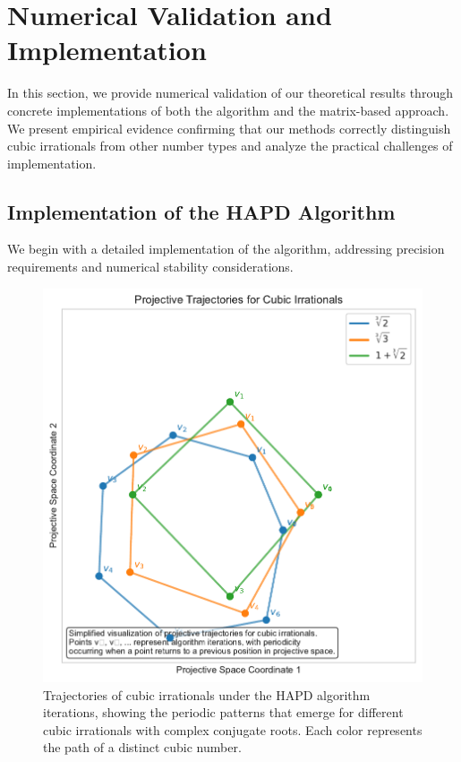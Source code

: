 \section{Numerical Validation and Implementation}\label{sec:numerical_validation}

In this section, we provide numerical validation of our theoretical results through concrete implementations of both the \HAPD{} algorithm and the matrix-based approach. We present empirical evidence confirming that our methods correctly distinguish cubic irrationals from other number types and analyze the practical challenges of implementation.

\subsection{Implementation of the HAPD Algorithm}

We begin with a detailed implementation of the \HAPD{} algorithm, addressing precision requirements and numerical stability considerations.

\begin{figure}[htbp]
\begin{minipage}{\textwidth}
\centering
\includegraphics[width=\textwidth]{figures/output/cubic_trajectories.pdf}
\caption{Trajectories of cubic irrationals under the HAPD algorithm iterations, showing the periodic patterns that emerge for different cubic irrationals with complex conjugate roots. Each color represents the path of a distinct cubic number.}
\label{fig:cubic_trajectories}
\end{minipage}
\end{figure}

